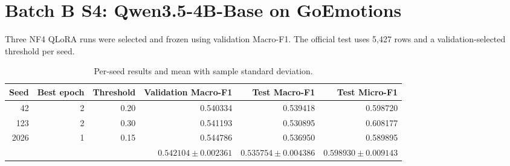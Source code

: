 \documentclass[10pt]{article}
\begin{document}
\section*{Batch B S4: Qwen3.5-4B-Base on GoEmotions}
Three NF4 QLoRA runs were selected and frozen using validation Macro-F1.
The official test uses 5,427 rows and a validation-selected threshold per seed.
\begin{table}[ht]
\centering
\begin{tabular}{rrrrrr}
\toprule
Seed & Best epoch & Threshold & Validation Macro-F1 & Test Macro-F1 & Test Micro-F1 \\
\midrule
42 & 2 & 0.20 & 0.540334 & 0.539418 & 0.598720 \\
123 & 2 & 0.30 & 0.541193 & 0.530895 & 0.608177 \\
2026 & 1 & 0.15 & 0.544786 & 0.536950 & 0.589895 \\
\midrule
 & & & $0.542104 \pm 0.002361$ & $0.535754 \pm 0.004386$ & $0.598930 \pm 0.009143$ \\
\bottomrule
\end{tabular}
\caption{Per-seed results and mean with sample standard deviation.}
\end{table}
\end{document}
